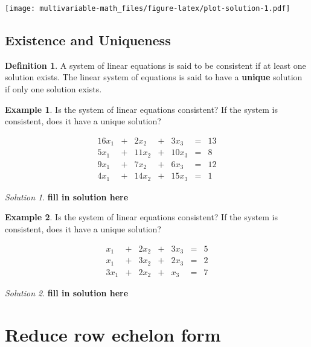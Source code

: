 \documentclass[
]{book}
\theoremstyle{definition}
\newtheorem{definition}{Definition}[chapter]
\theoremstyle{definition}
\newtheorem{example}{Example}[chapter]
\theoremstyle{definition}
\theoremstyle{definition}
\theoremstyle{remark}
\newtheorem*{solution}{Solution}
\begin{document}
\texttt{[image: multivariable-math\_files/figure-latex/plot-solution-1.pdf]}

\hypertarget{existence-and-uniqueness}{%
\subsection{Existence and Uniqueness}\label{existence-and-uniqueness}}

\begin{definition}
A system of linear equations is said to be consistent if at least one solution exists. The linear system of equations is said to have a \textbf{unique} solution if only one solution exists.
\end{definition}

\begin{example}
Is the system of linear equations consistent? If the system is consistent, does it have a unique solution?

\[
\begin{alignedat}{4}  16 x_1 & {}+{} & 2 x_2 & {}+{} & 3 x_3 & {}={} & 13\\ 5 x_1 & {}+{} & 11 x_2 & {}+{} & 10 x_3 & {}={} & 8\\ 9 x_1 & {}+{} & 7 x_2 & {}+{} & 6 x_3 & {}={} & 12\\ 4 x_1 & {}+{} & 14 x_2 & {}+{} & 15 x_3 & {}={} & 1 \end{alignedat}
\]
\end{example}

\begin{solution}
\textbf{fill in solution here}
\end{solution}

\begin{example}
Is the system of linear equations consistent? If the system is consistent, does it have a unique solution?

\[
\begin{alignedat}{4}   x_1 & {}+{} & 2 x_2 & {}+{} & 3 x_3 & {}={} & 5\\  x_1 & {}+{} & 3 x_2 & {}+{} & 2 x_3 & {}={} & 2\\ 3 x_1 & {}+{} & 2 x_2 & {}+{} &  x_3 & {}={} & 7 \end{alignedat}
\]
\end{example}

\begin{solution}
\textbf{fill in solution here}
\end{solution}

\hypertarget{reduce-row-echelon-form}{%
\section{Reduce row echelon form}\label{reduce-row-echelon-form}}
\end{document}
